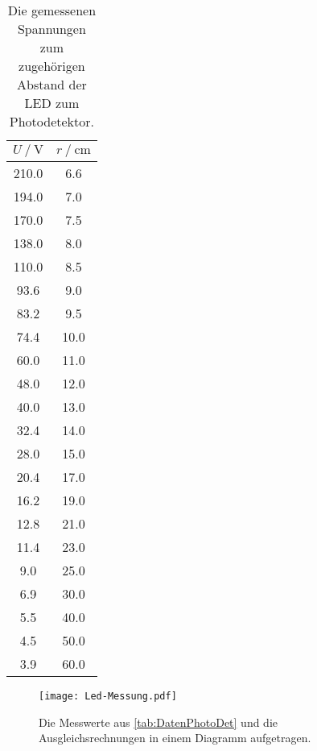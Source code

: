 \begin{table}
  \centering
  \caption{Die gemessenen Spannungen zum zugehörigen Abstand der LED zum Photodetektor.}
  \begin{tabular}{cc}
    \toprule
    {$U \mathbin{/} \unit{\volt}$} &
    {$r \mathbin{/} \unit{\centi\meter}$} \\
    \midrule
      210.0 & 6.6 \\
      194.0 & 7.0 \\
      170.0 & 7.5 \\
      138.0 & 8.0 \\
      110.0 & 8.5 \\
      93.6 & 9.0 \\
      83.2 & 9.5 \\
      74.4 & 10.0 \\
      60.0 & 11.0 \\
      48.0 & 12.0 \\
      40.0 & 13.0 \\
      32.4 & 14.0 \\
      28.0 & 15.0 \\
      20.4 & 17.0 \\
      16.2 & 19.0 \\
      12.8 & 21.0 \\
      11.4 & 23.0 \\
      9.0 & 25.0 \\
      6.9 & 30.0 \\
      5.5 & 40.0 \\
      4.5 & 50.0 \\
      3.9 & 60.0 \\
    \bottomrule
  \end{tabular}
  \label{tab:DatenPhotoDet}
\end{table}
\begin{figure}
  \centering
  \texttt{[image: Led-Messung.pdf]}
  \caption{Die Messwerte aus \autoref{tab:DatenPhotoDet} und die Ausgleichsrechnungen in einem Diagramm aufgetragen.}
  \label{fig:PhotoDet}
\end{figure}
